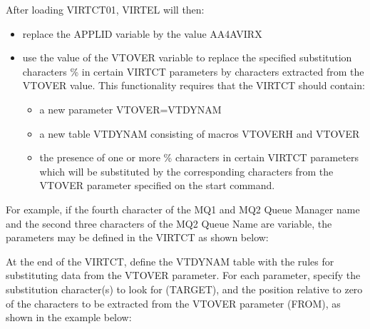 \documentclass[letterpaper,10pt,english]{sphinxmanual}
\begin{document}
\sphinxAtStartPar
After loading VIRTCT01, VIRTEL will then:
\begin{itemize}
\item {} 
\sphinxAtStartPar
replace the APPLID variable by the value AA4AVIRX

\item {} 
\sphinxAtStartPar
use the value of the VTOVER variable to replace the specified substitution characters \% in certain VIRTCT parameters by characters extracted from the VTOVER value. This functionality requires that the VIRTCT should contain:
\begin{itemize}
\item {} 
\sphinxAtStartPar
a new parameter VTOVER=VTDYNAM

\item {} 
\sphinxAtStartPar
a new table VTDYNAM consisting of macros VTOVERH and VTOVER

\item {} 
\sphinxAtStartPar
the presence of one or more \% characters in certain VIRTCT parameters which will be substituted by the corresponding characters from the VTOVER parameter specified on the start command.

\end{itemize}

\end{itemize}

\sphinxAtStartPar
For example, if the fourth character of the MQ1 and MQ2 Queue Manager name and the second three characters of the MQ2 Queue Name are variable, the parameters may be defined in the VIRTCT as shown below:

\begin{sphinxVerbatim}[commandchars=\\\{\}]
               
        
         
\end{sphinxVerbatim}

\sphinxAtStartPar
At the end of the VIRTCT, define the VTDYNAM table with the rules for substituting data from the VTOVER parameter. For each parameter, specify the substitution character(s) to look for (TARGET), and the position relative to zero of the characters to be extracted from the VTOVER parameter (FROM), as shown in the example below:
\end{document}

